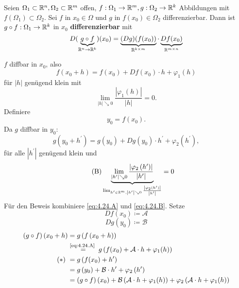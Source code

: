 \begin{theorem}[Kettenregel]
	Seien $ \Omega_1 \subset \mathbb{R} ^n, \Omega_2 \subset \mathbb{R} ^m $ offen, $ f : \Omega_1 \to \mathbb{R} ^m, g: \Omega_2 \to \mathbb{R} ^k $ Abbildungen mit $ f(\Omega_1) \subset \Omega_2 $.
	Sei $ f $ in $ x_0 \in \Omega $ und $ g $ in $ f(x_0) \in \Omega_2 $ differenzierbar.
	Dann ist $ g \circ f : \Omega_1 \to \mathbb{R} ^k $ in $ x_0 $ \textbf{differenzierbar} mit
	\[
		D( \underbrace{g \circ f}_{\mathbb{R} ^n \to \mathbb{R} ^k} ) (x_0) = \underbrace{(Dg)(f(x_0))}_{\mathbb{R} ^{k \times m} } \cdot \underbrace{Df(x_0)}_{\mathbb{R} ^{m \times n} }
	\]
	
\end{theorem}
\begin{proof*}
	$ f $ diffbar in $ x_0 $, also
	\begin{equation}
		\label{eq:4.24.A}
		\tag{A}
		f\left( x_0 + h \right) = f(x_0) + Df(x_0) \cdot h + \varphi_1(h)
	\end{equation}
	für $ \left| h \right|  $ genügend klein mit 
	\[
		\lim_{\left| h \right|  \searrow 0} \frac{ \left| \varphi_1 (h) \right| }{ \left| h \right|  } = 0.
	\]
	Definiere
	\[
		y_0 = f(x_0).
	\]
	Da $ g $ diffbar in $ y_0 $:
	\[
		g\left( y_0 + h^\prime  \right) = g(y_0) + Dg(y_0) \cdot h^\prime  + \varphi_2 \left( h^\prime  \right) ,
	\]
	für alle $ \left| h^\prime  \right|  $ genügend klein und
	\begin{equation}
		\label{eq:4.24.B}
		\tag{B}
		\underbrace{ \lim_{\left| h^\prime  \right|  \searrow 0} \frac{ \left| \varphi_2\left( h^\prime  \right) \right| }{ \left| h^\prime  \right|  }  }_{\lim_{h^\prime \in \mathbb{R} ^m, \left| h^\prime  \right|  \searrow 0} \frac{ \left| \varphi_2( h^\prime ) \right| }{ \left| h^\prime  \right|  }  } = 0
	\end{equation}
	Für den Beweis kombiniere \eqref{eq:4.24.A} und \eqref{eq:4.24.B}. Setze
	\[
		Df(x_0) \coloneqq  \mathcal{A} 
	\]
	\[
		Dg(y_0) \coloneqq \mathcal{B} 
	\]
	\begin{align*}
		\left( g \circ f \right) (x_0 + h) &= g\left( f\left( x_0 + h \right)  \right)  \\
		~ &\overset{\text{\eqref{eq:4.24.A} } }{=} g \left( f(x_0) + \mathcal{A} \cdot h + \varphi_1(h) \right)  \\
		\label{eq:2.14.3}
		\tag{$ * $}
		~ &= g\left( f(x_0) + h^\prime  \right)\\
		~ &= g\left( y_0 \right) + \mathcal{B} \cdot h^\prime  + \varphi_2\left( h^\prime  \right)  \\
		~ &= \left( g \circ f \right) (x_0) + \mathcal{B} \left( \mathcal{A} \cdot h + \varphi_1(h) \right) + \varphi_2\left( \mathcal{A} \cdot h + \varphi_1(h) \right)  \\

\end{align*}
\end{proof*}
